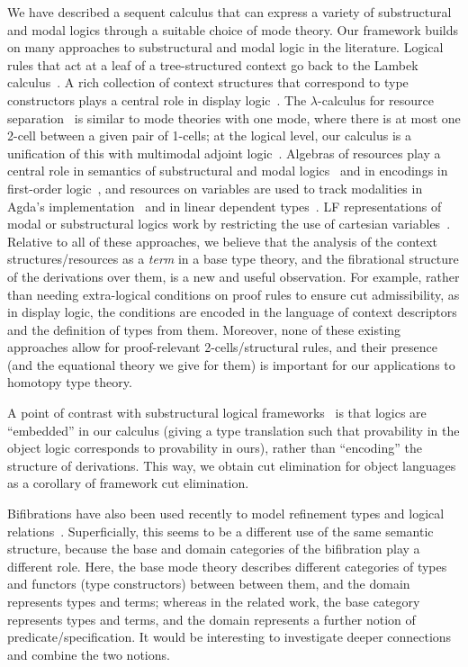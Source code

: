 \documentclass[a4paper,USenglish,numberwithinsect]{lipics-v2016}
\begin{document}
We have described a sequent calculus that can express a variety of
substructural and modal logics through a suitable choice of mode theory.
Our framework builds on many approaches to substructural and modal logic
in the literature.  Logical rules that act at a leaf of a
tree-structured context go back to the Lambek
calculus~\cite{lambek58calculus}.  A rich collection of context
structures that correspond to type constructors plays a central role in
display logic~\cite{belnap82display}.  The $\lambda$-calculus for
resource separation~\cite{atkey04separation} is similar to mode theories
with one mode, where there is at most one 2-cell between a given pair of
1-cells; at the logical level, our calculus is a unification of this
with multimodal adjoint logic~\cite{reed09adjoint}.  Algebras of
resources play a central role in semantics of substructural and modal
logics~\cite{restall00introduction} and in encodings in first-order
logic~\cite{reed09constructiveresource}, and resources on variables are
used to track modalities in Agda's implementation~\cite{abel15modal} and
in linear dependent types~\cite{mcbride16nuttin}.  LF representations of
modal or substructural logics work by restricting the use of cartesian
variables~\cite{crary10substructural}.  Relative to all of these
approaches, we believe that the analysis of the context
structures/resources as a \emph{term} in a base type theory, and the
fibrational structure of the derivations over them, is a new and useful
observation.  For example, rather than needing extra-logical conditions
on proof rules to ensure cut admissibility, as in display logic, the
conditions are encoded in the language of context descriptors and the
definition of types from them.  Moreover, none of these existing
approaches allow for proof-relevant 2-cells/structural rules, and their
presence (and the equational theory we give for them) is important for
our applications to homotopy type theory.

A point of contrast with substructural logical
frameworks~\cite{cervesatopfenning02llf,watkins+03clf-tr,reed09thesis}
is that logics are ``embedded'' in our calculus (giving a type
translation such that provability in the object logic corresponds to
provability in ours), rather than ``encoding'' the structure of
derivations.  This way, we obtain cut elimination for object languages
as a corollary of framework cut elimination.

Bifibrations have also been used recently to model refinement types and
logical
relations~\cite{zeilberger14functors,zeilbergermelies17presheaf,johann15bifibrational}.
Superficially, this seems to be a different use of the same semantic
structure, because the base and domain categories of the bifibration
play a different role.  Here, the base mode theory describes different
categories of types and functors (type constructors) between between
them, and the domain represents types and terms; whereas in the related
work, the base category represents types and terms, and the domain
represents a further notion of predicate/specification.  It would be
interesting to investigate deeper connections and combine the two
notions.
\end{document}
